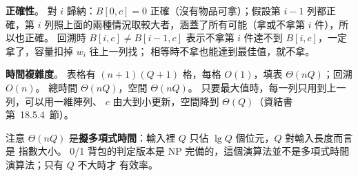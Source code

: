 \begin{pastsoln}
\textbf{正確性}。 對 $i$ 歸納：$B[0, c] = 0$ 正確（沒有物品可拿）；假設第 $i - 1$ 列都正確，第 $i$
列照上面的兩種情況取較大者，涵蓋了所有可能（拿或不拿第 $i$ 件），所以也正確。 回溯時
$B[i, c] \ne B[i-1, c]$ 表示不拿第 $i$ 件達不到 $B[i, c]$，一定拿了，容量扣掉 $w_i$ 往上一列找；
相等時不拿也能達到最佳值，就不拿。

\textbf{時間複雜度}。 表格有 $(n + 1)(Q + 1)$ 格，每格 $O(1)$，填表 $\Theta(nQ)$；回溯 $O(n)$。
總時間 $\Theta(nQ)$，空間 $\Theta(nQ)$。 只要最大值時，每一列只用到上一列，可以用一維陣列、
$c$ 由大到小更新，空間降到 $\Theta(Q)$（資結書第~18.5.4~節）。

注意 $\Theta(nQ)$ 是\textbf{擬多項式時間}：輸入裡 $Q$ 只佔 $\lg Q$ 個位元，$Q$ 對輸入長度而言是
指數大小。 0/1 背包的判定版本是 NP 完備的，這個演算法並不是多項式時間演算法；只有 $Q$ 不大時才
有效率。
\end{pastsoln}
